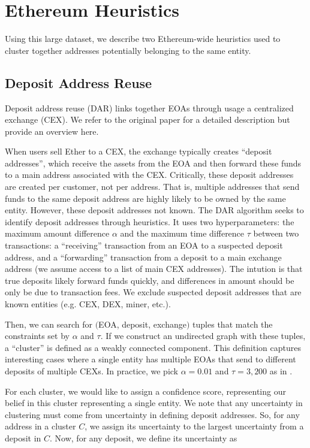 \documentclass[11pt,a4paper]{article}
\begin{document}
\section{Ethereum Heuristics}

Using this large dataset, we describe two Ethereum-wide heuristics used to cluster together addresses potentially belonging to the same entity.

\subsection{Deposit Address Reuse}

Deposit address reuse (DAR) links together EOAs through usage a centralized exchange (CEX). We refer to the original paper \citep{victor2020address} for a detailed description but provide an overview here.

When users sell Ether to a CEX, the exchange typically creates ``deposit addresses'', which receive the assets from the EOA and then forward these funds to a main address associated with the CEX. Critically, these deposit addresses are created per customer, not per address. That is, multiple addresses that send funds to the same deposit address are highly likely to be owned by the same entity. However, these deposit addresses not known. The DAR algorithm seeks to identify deposit addresses through heuristics.
It uses two hyperparameters: the maximum amount difference $\alpha$ and the maximum time difference $\tau$ between two transactions: a ``receiving'' transaction from an EOA to a suspected deposit address, and a ``forwarding'' transaction from a deposit to a main exchange address (we assume access to a list of main CEX addresses). The intution is that true deposits likely forward funds quickly, and differences in amount should be only be due to transaction fees. We exclude suspected deposit addresses that are known entities (e.g. CEX, DEX, miner, etc.).

Then, we can search for $($EOA, deposit, exchange$)$ tuples that match the constraints set by $\alpha$ and $\tau$.
If we construct an undirected graph with these tuples, a ``cluster'' is defined as a weakly connected component. This definition captures interesting cases where a single entity has multiple EOAs that send to different deposits of multiple CEXs. In practice, we pick $\alpha = 0.01$ and $\tau = 3,200$ as in \citep{victor2020address}.

For each cluster, we would like to assign a confidence score, representing our belief in this cluster representing a single entity. We note that any uncertainty in clustering must come from uncertainty in defining deposit addresses. So, for any address in a cluster $C$, we assign its uncertainty to the largest uncertainty from a deposit in $C$. Now, for any deposit, we define its uncertainty as
\end{document}
